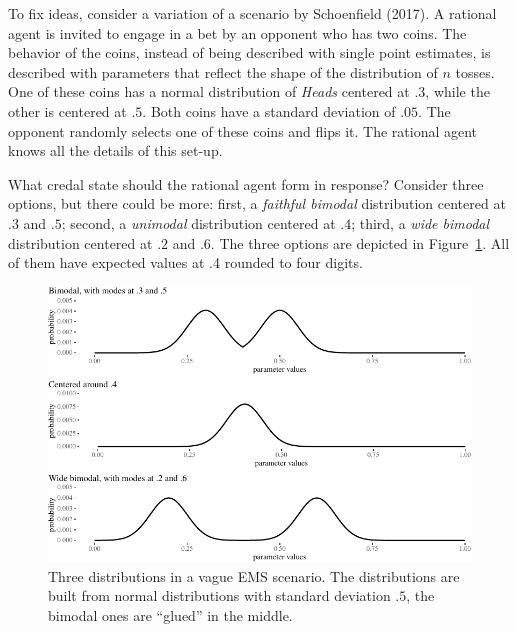 \documentclass[
  letterpaper,
  DIV=11,
  numbers=noendperiod]{scrartcl}
\begin{document}
To fix ideas, consider a variation of a scenario by Schoenfield (2017).
A rational agent is invited to engage in a bet by an opponent who has
two coins. The behavior of the coins, instead of being described with
single point estimates, is described with parameters that reflect the
shape of the distribution of \(n\) tosses. One of these coins has a
normal distribution of \emph{Heads} centered at \(.3\), while the other
is centered at \(.5\). Both coins have a standard deviation of \(.05\).
The opponent randomly selects one of these coins and flips it. The
rational agent knows all the details of this set-up.

What credal state should the rational agent form in response? Consider
three options, but there could be more: first, a \emph{faithful bimodal}
distribution centered at \(.3\) and \(.5\); second, a \emph{unimodal}
distribution centered at \(.4\); third, a \emph{wide bimodal}
distribution centered at \(.2\) and \(.6\). The three options are
depicted in Figure~\ref{fig-emc}. All of them have expected values at .4
rounded to four digits.

\begin{figure}[H]

{\centering \includegraphics[width=1\textwidth,height=\textheight]{imp_philosophical_backup_files/figure-pdf/fig-emc-1.pdf}

}

\caption{\label{fig-emc}Three distributions in a vague EMS scenario. The
distributions are built from normal distributions with standard
deviation \(.5\), the bimodal ones are ``glued'' in the middle.}

\end{figure}
\end{document}
